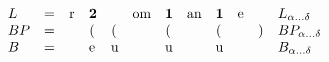\[ \begin{array}{llllllllllll}
L &= &\text{\lstinline|r|} &\text{\textbf{2}}
     &&\text{\lstinline|om|} &\text{\textbf{1}}
     &\text{\lstinline|an|} &\text{\textbf{1}}
     &\text{\lstinline|e|}
     &&L_{\alpha\ldots \delta} \\
BP &= &&\text{\lstinline|(|}&\text{\lstinline|(|}
      &&\text{\lstinline|(|}
      &&\text{\lstinline|(|}
      &&\text{\lstinline|)|}
      &BP_{\alpha\ldots \delta} \\
B &= &&\text{\lstinline|e|}&\text{\lstinline|u|}
     &&\text{\lstinline|u|}
     &&\text{\lstinline|u|}
     &&&B_{\alpha\ldots \delta}
\end{array}
\]
